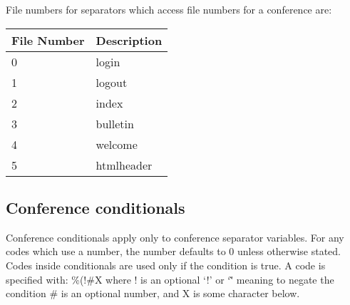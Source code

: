 \documentclass[twoside]{report}
\begin{document}
         File numbers for separators which access file numbers for a 
         conference are:

         \begin{tabular}{ll}
            File Number & Description \\ \hline

            0           & login\index{files!login} \\
            1           & logout\index{files!logout} \\
            2           & index\index{files!index} \\
            3           & bulletin\index{files!index} \\
            4           & welcome\index{files!welcome} \\
            5           & htmlheader\index{files!htmlheader} \\
         \end{tabular} 

      \subsection{Conference conditionals}

         Conference conditionals apply only to conference separator
         variables.  For any codes which use a number, the number defaults to 0
         unless otherwise stated.  Codes inside conditionals are used only if
         the condition is true.  A code is specified with: \%(!\#X 
         where ! is an optional `!' or `\~' meaning to negate the condition
         \# is an optional number, and  X is some character below.
\end{document}
